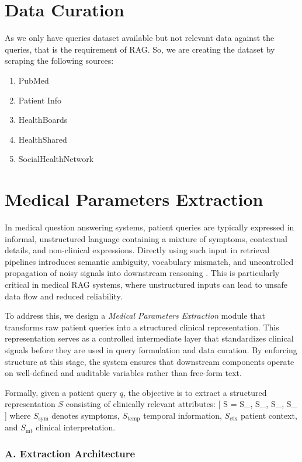 \documentclass[conference, anonymous]{IEEEtran}
\begin{document}
\section{Data Curation}
As we only have queries dataset available but not relevant data against the queries, that is the requirement of RAG.
So, we are creating the dataset by scraping the following sources:
\begin{enumerate}
    \item PubMed
    \item Patient Info
    \item HealthBoards
    \item HealthShared
    \item SocialHealthNetwork
\end{enumerate}


\section{Medical Parameters Extraction}

In medical question answering systems, patient queries are typically expressed in informal, unstructured language containing a mixture of symptoms, contextual details, and non-clinical expressions. Directly using such input in retrieval pipelines introduces semantic ambiguity, vocabulary mismatch, and uncontrolled propagation of noisy signals into downstream reasoning \cite{demner2009nlp,trec2017}. This is particularly critical in medical RAG systems, where unstructured inputs can lead to unsafe data flow and reduced reliability.

To address this, we design a \textit{Medical Parameters Extraction} module that transforms raw patient queries into a structured clinical representation. This representation serves as a controlled intermediate layer that standardizes clinical signals before they are used in query formulation and data curation. By enforcing structure at this stage, the system ensures that downstream components operate on well-defined and auditable variables rather than free-form text.

Formally, given a patient query $q$, the objective is to extract a structured representation $S$ consisting of clinically relevant attributes:
[
S = {S_{}, S_{}, S_{}, S_{}}
]
where $S_{\text{sym}}$ denotes symptoms, $S_{\text{temp}}$ temporal information, $S_{\text{ctx}}$ patient context, and $S_{\text{int}}$ clinical interpretation.

\subsubsection{A. Extraction Architecture}
\end{document}
